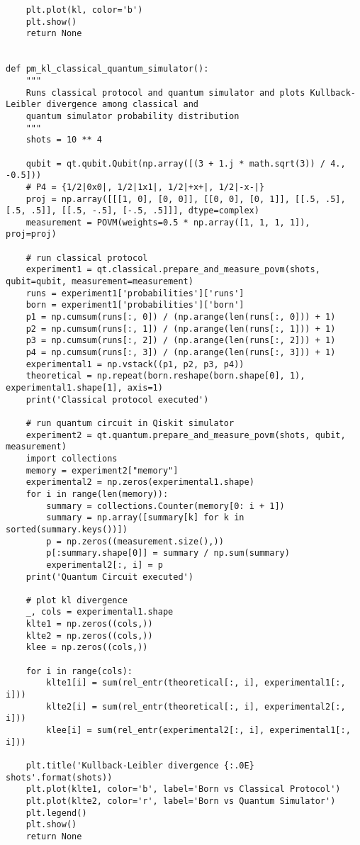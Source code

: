 \begin{verbatim}
    plt.plot(kl, color='b')
    plt.show()
    return None


def pm_kl_classical_quantum_simulator():
    """
    Runs classical protocol and quantum simulator and plots Kullback-Leibler divergence among classical and
    quantum simulator probability distribution
    """
    shots = 10 ** 4

    qubit = qt.qubit.Qubit(np.array([(3 + 1.j * math.sqrt(3)) / 4., -0.5]))
    # P4 = {1/2|0x0|, 1/2|1x1|, 1/2|+x+|, 1/2|-x-|}
    proj = np.array([[[1, 0], [0, 0]], [[0, 0], [0, 1]], [[.5, .5], [.5, .5]], [[.5, -.5], [-.5, .5]]], dtype=complex)
    measurement = POVM(weights=0.5 * np.array([1, 1, 1, 1]), proj=proj)

    # run classical protocol
    experiment1 = qt.classical.prepare_and_measure_povm(shots, qubit=qubit, measurement=measurement)
    runs = experiment1['probabilities']['runs']
    born = experiment1['probabilities']['born']
    p1 = np.cumsum(runs[:, 0]) / (np.arange(len(runs[:, 0])) + 1)
    p2 = np.cumsum(runs[:, 1]) / (np.arange(len(runs[:, 1])) + 1)
    p3 = np.cumsum(runs[:, 2]) / (np.arange(len(runs[:, 2])) + 1)
    p4 = np.cumsum(runs[:, 3]) / (np.arange(len(runs[:, 3])) + 1)
    experimental1 = np.vstack((p1, p2, p3, p4))
    theoretical = np.repeat(born.reshape(born.shape[0], 1), experimental1.shape[1], axis=1)
    print('Classical protocol executed')

    # run quantum circuit in Qiskit simulator
    experiment2 = qt.quantum.prepare_and_measure_povm(shots, qubit, measurement)
    import collections
    memory = experiment2["memory"]
    experimental2 = np.zeros(experimental1.shape)
    for i in range(len(memory)):
        summary = collections.Counter(memory[0: i + 1])
        summary = np.array([summary[k] for k in sorted(summary.keys())])
        p = np.zeros((measurement.size(),))
        p[:summary.shape[0]] = summary / np.sum(summary)
        experimental2[:, i] = p
    print('Quantum Circuit executed')

    # plot kl divergence
    _, cols = experimental1.shape
    klte1 = np.zeros((cols,))
    klte2 = np.zeros((cols,))
    klee = np.zeros((cols,))

    for i in range(cols):
        klte1[i] = sum(rel_entr(theoretical[:, i], experimental1[:, i]))
        klte2[i] = sum(rel_entr(theoretical[:, i], experimental2[:, i]))
        klee[i] = sum(rel_entr(experimental2[:, i], experimental1[:, i]))

    plt.title('Kullback-Leibler divergence {:.0E} shots'.format(shots))
    plt.plot(klte1, color='b', label='Born vs Classical Protocol')
    plt.plot(klte2, color='r', label='Born vs Quantum Simulator')
    plt.legend()
    plt.show()
    return None



\end{verbatim}
